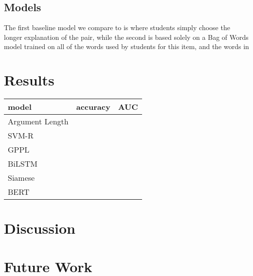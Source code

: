 \documentclass[runningheads]{llncs}
\begin{document}
\subsection{Models}
The first baseline model we compare to is where students simply choose the 
longer explanation of the pair, while the second is based solely on a Bag of 
Words model trained on all of the words used by students for this item, and the 
words in 


\section{Results}
\begin{table}
	\begin{tabular}{l|l|l}
		\toprule
		model & accuracy & AUC \\
		\toprule
		Argument Length &  &  \\
		SVM-R &  &  \\
		GPPL & & \\
		BiLSTM & & \\
		Siamese &  &  \\
		BERT & & \\	
	\end{tabular}
\end{table}
\section{Discussion}

\section{Future Work}

 
 
\end{document}
